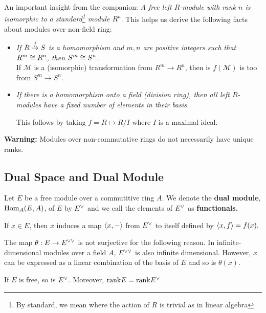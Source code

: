     \horline  

    \noindent An important insight from the companion:
    \textit{A free left $R$-module with rank $n$ is isomorphic to a standard\footnote{By standard, we mean where the action of $R$ is trivial as in linear algebra} module $R^n.$} This helps us derive the following facts about modules over non-field ring:

    \begin{itemize}
        \item \textit{If $R \overset{f}{\to} S$ is a homomorphism and $m, n$ are positive integers such that $R^m \cong R^n$, then $S^m \cong S^n$.}\\
        If $\mathcal{M}$ is a (isomorphic) transformation from $R^m \to R^n$, then is $f(\mathcal{M})$ is too from $S^m \to S^n$.

        \item \textit{If there is a homomorphism onto a  field (division ring), then all left $R$-modules have a fixed number of elements in their basis.}
    
        
        This follows by taking $f = R \mapsto R/I$ where $I$ is a maximal ideal.
        
        
    \end{itemize}

    \textbf{Warning:} Modules over non-commutative  rings do not  necessarily have unique ranks. 

    \subsection*{Dual Space and Dual Module}
    Let $E$ be a free module over a commutitive ring $A$. We denote the \textbf{dual module}, $\mathrm{Hom}_A(E, A)$, of $E$ by $E^{\vee}$ and we call the elements of $E^{\vee}$ as \textbf{functionals.}

    If $x \in E$, then $x$ induces a map $\langle x, - \rangle$ from $E^{\vee}$ to itself defined by $\langle x, f \rangle = f(x).$ 

    \horline
    The map $\theta: E \to E^{\vee \vee}$ is not surjective for the following reason. In infinite-dimensional modules over a field $A$, $E^{\vee \vee}$ is also infinite dimensional. However, $x$ can be expressed as a linear combination of the basis of $E$ and so is $\theta(x).$\\
    \horline

    \begin{proposition}
        If $E$ is free, so is $E^{\vee}.$ Moreover, $\mathrm{rank} E = \mathrm{rank} E^{\vee}$
    \end{proposition}

